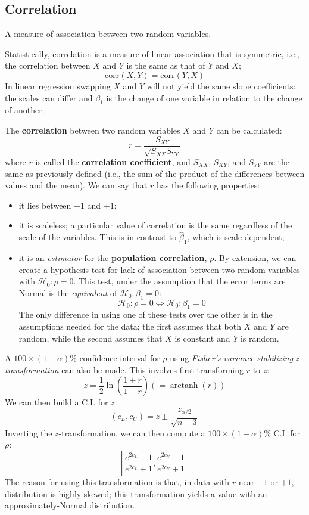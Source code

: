 \documentclass[12pt]{article}
\DeclareMathOperator{\arctanh}{arctanh}
\begin{document}
\subsection{Correlation}
\begin{definitionEnd}[Correlation]
    A measure of association between two random variables. 
\end{definitionEnd}

Statistically, correlation is a measure of linear association that is symmetric, i.e., the correlation between $X$ and $Y$ is the same as that of $Y$ and $X$;\[\text{corr}(X,Y) = \text{corr}(Y,X)\]In linear regression swapping $X$ and $Y$ will not yield the same slope coefficients: the scales can differ and $\beta_1$ is the change of one variable in relation to the change of another.

The \textbf{correlation} between two random variables $X$ and $Y$ can be calculated:\[r = \frac{S_{XY}}{\sqrt{S_{XX}S_{YY}}}\] where $r$ is called the \textbf{correlation coefficient}, and $S_{XX}$, $S_{XY}$, and $S_{YY}$ are the same as previously defined (i.e., the sum of the product of the differences between values and the mean). We can say that $r$ has the following properties:
\begin{itemize}
    \item it lies between $-1$ and $+1$;
    \item it is scaleless; a particular value of correlation is the same regardless of the scale of the variables. This is in contrast to $\hat{\beta}_1$, which is scale-dependent;
    \item it is an \textit{estimator} for the \textbf{population correlation}, $\rho$. By extension, we can create a hypothesis test for lack of association between two random variables with $\mathcal{H}_0: \rho = 0$. This test, under the assumption that the error terms are Normal is the \textit{equivalent} of $\mathcal{H}_0: \beta_1 = 0$:\[\mathcal{H}_0: \rho = 0 \iff \mathcal{H}_0: \beta_1 = 0\]The only difference in using one of these tests over the other is in the assumptions needed for the data; the first assumes that both $X$ and $Y$ are random, while the second assumes that $X$ is constant and $Y$ is random.
\end{itemize}

A $100\times(1-\alpha)\%$ confidence interval for $\rho$ using \textit{Fisher's variance stabilizing $z$-transformation} can also be made. This involves first transforming $r$ to $z$:\[z = \frac{1}{2}\ln\left(\frac{1+r}{1-r}\right) (=\arctanh(r))\]We can then build a C.I. for $z$:\[(c_L, c_U) = z \pm \frac{z_{\alpha/2}}{\sqrt{n-3}}\]Inverting the $z$-transformation, we can then compute a $100 \times (1- \alpha)\%$ C.I. for $\rho$:\[\left[\frac{e^{2c_L}-1}{e^{2c_L}+1}, \frac{e^{2c_U}-1}{e^{2c_U}+1}\right]\] The reason for using this transformation is that, in data with $r$ near $-1$ or $+1$, distribution is highly skewed; this transformation yields a value with an approximately-Normal distribution.
\end{document}
